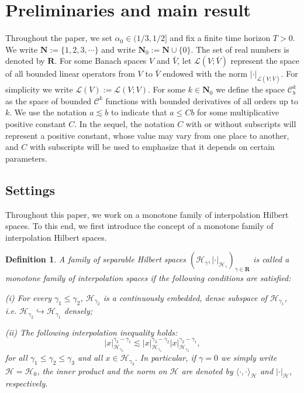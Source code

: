\documentclass[10pt,a4paper]{article}
\newtheorem{definition}{Definition}[section]
\numberwithin{equation}{section}
\begin{document}
\section{Preliminaries and main result}\label{sect2}

Throughout the paper, we set $\alpha_0 \in (1/3,1/2]$ and fix a finite time horizon $T > 0$.
We write $\mathbf N:=\{1,2,3,\cdots\}$ and write $\mathbf N_0:=\mathbf N \cup \{0\}$.
The set of real numbers is denoted by $\mathbf R$.
For some Banach spaces $V$ and $\bar{V}$, let $\mathcal{L} (V; \bar{V})$ represent the space of all bounded linear operators from $V$ to $\bar{V}$ endowed with the norm $|\cdot|_{\mathcal{L} (V; \bar{V})}$.
For simplicity we write $\mathcal{L}(V):= \mathcal{L} (V; V )$.
For some $k\in\mathbf{N}_{0}$ we define the space $\mathcal{C}^{k}_{b}$ as the space of bounded $\mathcal C^k$ functions with bounded derivatives of all orders up to $k$.
We use the notation $a \lesssim b$ to indicate that $a\leq C b $ for some multiplicative positive constant $C$.
In the sequel, the notation $C$ with or without subscripts will represent a positive constant, whose value may vary from one place to another,
and $C$ with subscripts will be used to emphasize that it depends on certain parameters.












\subsection{Settings}


Throughout this paper, we work on a monotone family of interpolation Hilbert spaces.
To this end, we first introduce the concept of a monotone family of interpolation Hilbert spaces.

\begin{definition}
A family of separable Hilbert spaces $(\mathcal H_\gamma, |\cdot |_{\mathcal H_\gamma})_{\gamma \in \mathbf R}$ is called a monotone family of interpolation spaces if the following conditions are satisfied:

(i) For every $\gamma_1\leq\gamma_2$,  $\mathcal{H}_{\gamma_2}$ is a continuously embedded, dense
subspace of $\mathcal{H}_{\gamma_1}$, i.e. $\mathcal{H}_{\gamma_2} \hookrightarrow  \mathcal{H}_{\gamma_1}$ densely;

(ii) The following interpolation inequality holds:
\begin{equation}\label{interp}
	|x|_{\mathcal H_{\gamma_2}}^{\gamma_3-\gamma_1} \lesssim |x|_{\mathcal H_{\gamma_1}}^{\gamma_3-\gamma_2} |x|_{\mathcal H_{\gamma_3}}^{\gamma_2-\gamma_1},
\end{equation}
for all $\gamma_1 \leq \gamma_2 \leq \gamma_3$ and all $x \in \mathcal H_{\gamma_3}$.
In particular, if $\gamma=0$ we simply write $\mathcal H=\mathcal H_0$,
the inner product and the norm on $\mathcal H$ are denoted by $\langle \cdot, \cdot \rangle_{\mathcal H}$ and $| \cdot |_{\mathcal H}$, respectively.
\end{definition}
\end{document}

